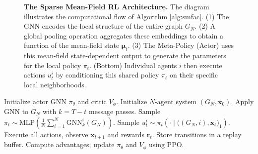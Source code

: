 \documentclass{article}
\begin{document}
\begin{figure}[t]
{
  }
  \caption{\textbf{The Sparse Mean-Field RL Architecture.} The diagram illustrates the computational flow of Algorithm \ref{alg:smfac}. (1) The GNN encodes the local structure of the entire graph $G_N$. (2) A global pooling operation aggregates these embeddings to obtain a function of the mean-field state $\boldsymbol{\mu}_t$. (3) The Meta-Policy (Actor) uses this mean-field state-dependent output to generate the parameters for the local policy $\pi_t$. (Bottom) Individual agents $i$ then execute actions $u_t^i$ by conditioning this shared policy $\pi_t$ on their specific local neighborhoods.}
  \label{fig:architecture}
\end{figure}

\begin{algorithm}[b!]
    \caption{Sparse Mean-Field Actor--Critic (SMFAC)}
    \label{alg:smfac}
    \begin{algorithmic}[1]
        \STATE Initialize actor GNN $\pi_\theta$ and critic $V_\phi$.
            \STATE Initialize $N$-agent system $(G_N, \mathbf{x}_0)$.
                \STATE Apply GNN to $G_N$ with $k=T - t$ message passes.
                \STATE Sample $\pi _t \sim \mathrm{MLP} \left( \frac 1 N \sum_{i=1} ^N \mathrm{GNN}_k ^i (G_N) \right).$
                    \STATE Sample $u_t^i \sim \pi_t(\cdot \mid \big((G_N,i), \mathbf x_t \big)_1)$.
                \ENDFOR
                \STATE Execute all actions, observe $\mathbf{x}_{t+1}$ and rewards $\mathbf{r}_t$.
                \STATE Store transitions in a replay buffer.
            \ENDFOR
            \STATE Compute advantages; update $\pi_\theta$ and $V_\phi$ using PPO.
        \ENDFOR
    \end{algorithmic}
\end{algorithm}
\end{document}
